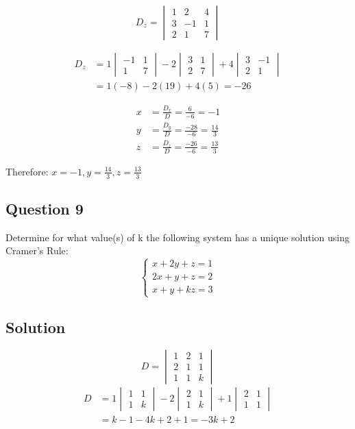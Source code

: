 \documentclass[12pt]{article}
\begin{document}
\[
	D_z = \begin{vmatrix}
		1 & 2 & 4 \\
		3 & -1 & 1 \\
		2 & 1 & 7
	\end{vmatrix}
\]

\begin{align*}
	D_z &= 1\begin{vmatrix}
		-1 & 1 \\
		1 & 7
	\end{vmatrix} - 2\begin{vmatrix}
		3 & 1 \\
		2 & 7
	\end{vmatrix} + 4\begin{vmatrix}
		3 & -1 \\
		2 & 1
	\end{vmatrix} \\
	&= 1(-8) - 2(19) + 4(5) = -26
\end{align*}

\begin{align*}
	x &= \frac{D_x}{D} = \frac{6}{-6} = -1 \\
	y &= \frac{D_y}{D} = \frac{-28}{-6} = \frac{14}{3} \\
	z &= \frac{D_z}{D} = \frac{-26}{-6} = \frac{13}{3}
\end{align*}

Therefore: $x = -1, y = \frac{14}{3}, z = \frac{13}{3}$

\subsection*{Question 9}
Determine for what value(s) of k the following system has a unique solution using Cramer's Rule:
$$
\begin{cases}
x + 2y + z = 1 \\
2x + y + z = 2 \\
x + y + kz = 3
\end{cases}
$$

\subsection*{Solution}

\[
	D = \begin{vmatrix}
		1 & 2 & 1 \\
		2 & 1 & 1 \\
		1 & 1 & k
	\end{vmatrix}
\]
\begin{align*}
	D &= 1\begin{vmatrix}
		1 & 1 \\
		1 & k
	\end{vmatrix} - 2\begin{vmatrix}
		2 & 1 \\
		1 & k
	\end{vmatrix} + 1\begin{vmatrix}
		2 & 1 \\
		1 & 1
	\end{vmatrix} \\
	&= k - 1 - 4k + 2 + 1 = -3k + 2
\end{align*}
\end{document}
